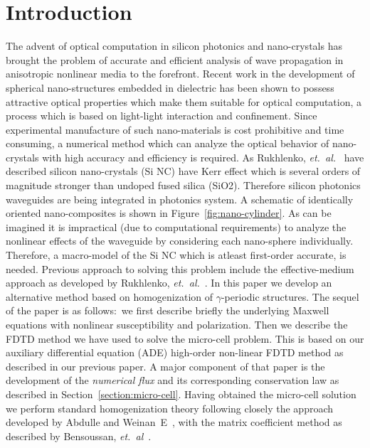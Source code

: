 \documentclass{article}[12pt]
\theoremstyle{plain}
\begin{document}
\section{Introduction}
\label{sec:introduction}
The advent of optical computation in 
silicon photonics and nano-crystals has brought the problem of accurate
and efficient analysis of wave propagation in anisotropic nonlinear media to the forefront.
Recent work in the development of spherical nano-structures embedded in dielectric
has been shown to possess attractive optical properties which make them suitable for optical
computation,  a process which is based on light-light interaction and confinement.
Since experimental manufacture of such nano-materials is cost prohibitive and time consuming, a
numerical method which can analyze the optical behavior of nano-crystals with high accuracy and
efficiency is required. As Rukhlenko, \emph{et.~al.}~\cite{rukhlenko2012effective} have described
silicon nano-crystals (Si NC) have Kerr effect which is several orders of magnitude
stronger than undoped fused silica (SiO2). Therefore silicon photonics waveguides are being
integrated in photonics system. A schematic of identically oriented nano-composites is
shown in Figure~\ref{fig:nano-cylinder}. As can be imagined it is impractical (due to
computational requirements) to analyze the nonlinear effects of the waveguide by considering
each nano-sphere individually. Therefore, a macro-model of the Si NC which is atleast first-order
accurate, is needed. Previous approach to solving this problem include the effective-medium
approach as developed by Rukhlenko, \emph{et.~al.}~\cite{rukhlenko2012effective}.
In this paper we develop an alternative method based on homogenization of $\gamma$-periodic
structures. The sequel of the paper is as follows:~we first describe briefly the underlying
Maxwell equations with nonlinear susceptibility and polarization. Then we describe the FDTD
method we have used to solve the micro-cell problem. This is based on our auxiliary differential
equation (ADE) high-order non-linear FDTD method as described in our previous paper. A major
component of that paper is the development of the \emph{numerical flux} and its corresponding
conservation law as described in Section~\ref{section:micro-cell}. Having obtained the micro-cell
solution we perform standard homogenization theory  following closely the approach developed
by Abdulle and Weinan~E~\cite{abdulle2003finite}, with the matrix coefficient method
as described by Bensoussan, \emph{et.~al}~\cite{bensoussan2011asymptotic}.
\end{document}
